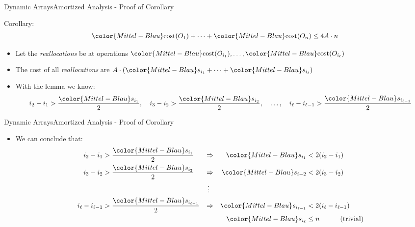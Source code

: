 \begin{frame}{Dynamic Arrays}{Amortized Analysis - Proof of Corollary}
  \begin{block}{Corollary:}
    \begin{displaymath}
      {\color{Mittel-Blau}\mathrm{cost}(O_1)}+\dots+
      {\color{Mittel-Blau}\mathrm{cost}(O_n)} \leq 4 A \cdot n
    \end{displaymath}
  \end{block}
  \begin{itemize}
    \item
      Let the \textit{reallocations} be at operations
      \begin{math}
        {\color{Mittel-Blau}\mathrm{cost}(O_{i_1})},\dots,
        {\color{Mittel-Blau}\mathrm{cost}(O_{i_\ell})}
      \end{math}
    \item
      The {\color{Mittel-Blau}cost} of all \textit{reallocations} are
      \begin{math}
        A \cdot \left(
          {\color{Mittel-Blau}s_{i_1}}+\dots+{\color{Mittel-Blau}s_{i_\ell}}
        \right)
      \end{math}
    \item
      With the lemma we know:
      \begin{displaymath}
        i_2-i_1 > \frac{\color{Mittel-Blau}s_{i_1}}{2},\hspace{1.0em}
        i_3-i_2 > \frac{\color{Mittel-Blau}s_{i_2}}{2},\hspace{1.0em}
        \dotsc,\hspace{1.0em}
        i_\ell-i_{\ell-1} > \frac{\color{Mittel-Blau}s_{i_{\ell-1}}}{2}
      \end{displaymath}
  \end{itemize}
\end{frame}


\begin{frame}{Dynamic Arrays}{Amortized Analysis - Proof of Corollary}
  \begin{itemize}
    \item
      We can conclude that:
      \begin{align*}
        i_2-i_1 &> \frac{\color{Mittel-Blau}s_{i_1}}{2} &
        \Rightarrow &&
        {\color{Mittel-Blau}s_{i_1}} &< 2 (i_2 - i_1)\\
        i_3-i_2 &> \frac{\color{Mittel-Blau}s_{i_2}}{2} &
        \Rightarrow &&
        {\color{Mittel-Blau}s_{i-2}} &< 2 (i_3 - i_2)\\
        {} & {} & \vdots\;\;\\
        i_\ell-i_{\ell-1} &> \frac{\color{Mittel-Blau}s_{i_{\ell-1}}}{2} &
        \Rightarrow &&
        {\color{Mittel-Blau}s_{i_{\ell-1}}} &< 2 (i_\ell - i_{\ell-1})\\
        {} & {} & {} &&
        {\color{Mittel-Blau}s_{i_\ell}} &\leq n
        \hspace*{3.0em}\text{(trivial)}
      \end{align*}
  \end{itemize}
\end{frame}

